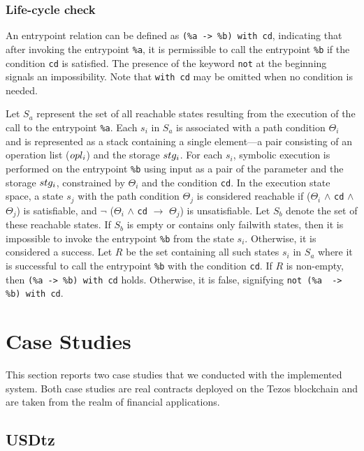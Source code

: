 \documentclass[a4paper,USenglish,cleveref, autoref, thm-restate]{lipics-v2021}
\begin{document}
\subsubsection{Life-cycle check}
\label{sec:life-cycle-check}
An entrypoint relation can be defined as \lstinline/(%a -> %b) with cd/, indicating that after invoking the entrypoint \lstinline/%a/, it is permissible to call the entrypoint \lstinline/%b/ if the condition \lstinline/cd/ is satisfied. The presence of the keyword \lstinline/not/ at the beginning signals an impossibility. Note that \lstinline/with cd/ may be omitted when no condition is needed.

Let $S_a$ represent the set of all reachable states resulting from the execution of the call to the entrypoint \lstinline/%a/. Each $s_{i}$ in $S_a$ is associated with a path condition $\Theta_i$ and is represented as a stack containing a single element—a pair consisting of an operation list ($opl_i$) and the storage $stg_i$. For each $s_{i}$, symbolic execution is performed on the entrypoint \lstinline/%b/ using input as a pair of the parameter and the storage $stg_i$, constrained by $\Theta_i$ and the condition \lstinline/cd/. In the execution state space, a state $s_{j}$ with the path condition $\Theta_j$ is considered reachable if ($\Theta_i$ $\land$ \lstinline/cd/ $\land$ $\Theta_j$) is satisfiable, and $\neg$ ($\Theta_i$ $\land$ \lstinline/cd/ $\rightarrow$ $\Theta_j$) is unsatisfiable. Let $S_b$ denote the set of these reachable states. If $S_b$ is empty or contains only failwith states, then it is impossible to invoke the entrypoint \lstinline/%b/ from the state $s_{i}$. Otherwise, it is considered a success. Let $R$ be the set containing all such states $s_{i}$ in $S_a$ where it is successful to call the entrypoint \lstinline/%b/ with the condition \lstinline/cd/. If $R$ is non-empty, then \lstinline/(%a -> %b) with cd/ holds. Otherwise, it is false, signifying \lstinline/not (%a  -> %b) with cd/.

\section{Case Studies}
\label{sec:case-stud-subs}

This section reports two case studies that we conducted with the
implemented system. Both case studies are real contracts deployed on
the Tezos blockchain and are taken from the realm of financial
applications. 

\subsection{USDtz}
\label{sec:usdtz}
\end{document}
